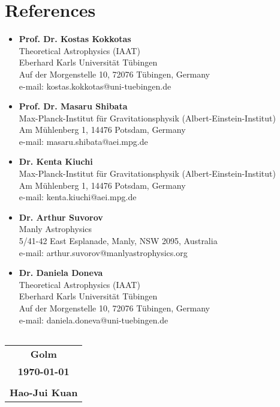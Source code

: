 \documentclass[10pt,floatfix,a4paper]{article}
\begin{document}
\section*{References}
\begin{itemize}
    \item \textbf{Prof. Dr. Kostas Kokkotas}\\
    Theoretical Astrophysics (IAAT)\\ 
    Eberhard Karls Universit\"at T\"ubingen \\
    Auf der Morgenstelle 10, 72076 T\"ubingen, Germany\\
    e-mail: kostas.kokkotas@uni-tuebingen.de
    \vspace{2mm}
    \item \textbf{Prof. Dr. Masaru Shibata}\\
    Max-Planck-Institut f{\"u}r Gravitationsphysik 
	(Albert-Einstein-Institut) \\
    Am M{\"u}hlenberg 1, 14476 Potsdam, Germany\\
    e-mail: masaru.shibata@aei.mpg.de
    \vspace{2mm}
    \item \textbf{Dr. Kenta Kiuchi}\\
    Max-Planck-Institut f{\"u}r Gravitationsphysik 
	(Albert-Einstein-Institut) \\
    Am M{\"u}hlenberg 1, 14476 Potsdam, Germany\\
    e-mail: kenta.kiuchi@aei.mpg.de
    \vspace{2mm}
    \item \textbf{Dr. Arthur Suvorov}\\
    Manly Astrophysics\\
    5/41-42 East Esplanade, Manly, NSW 2095, Australia\\
    e-mail: arthur.suvorov@manlyastrophysics.org
    \vspace{2mm}
    \item \textbf{Dr. Daniela Doneva}\\
    Theoretical Astrophysics (IAAT)\\ 
    Eberhard Karls Universit\"at T\"ubingen \\
    Auf der Morgenstelle 10, 72076 T\"ubingen, Germany\\
    e-mail: daniela.doneva@uni-tuebingen.de
\end{itemize}

\vspace{2cm}
\Large
\begingroup
  \small
  \renewcommand*{\arraystretch}{1.5}
  \noindent
  \begin{tabular}[t]{@{}l@{}}
  
  \end{tabular}\hfill
  \begin{tabular}[t]{c}
    \textbf{Golm}\\
    \textbf{\today}\\
    \\
    \textbf{Hao-Jui Kuan}\\
  \end{tabular}
\endgroup
\fi
\end{document}
